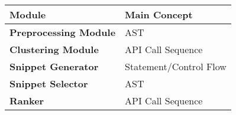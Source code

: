 \begin{tabular}{ll}
\toprule
\textbf{Module} & \textbf{Main Concept} \\
\midrule
\textbf{Preprocessing Module} & AST \\
\textbf{Clustering Module} & API Call Sequence \\
\textbf{Snippet Generator} & Statement/Control Flow\\
\textbf{Snippet Selector} & AST \\
\textbf{Ranker} & API Call Sequence \\
\bottomrule
\end{tabular}